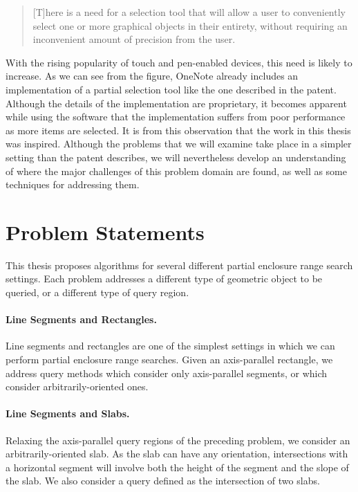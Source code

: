 \begin{quote}
[T]here is a need for a selection tool that will allow a user to conveniently select one or more graphical objects in their entirety, without requiring an inconvenient amount of precision from the user.
\end{quote}

\noindent With the rising popularity of touch and pen-enabled devices, this need is likely to increase.  
As we can see from the figure, OneNote already includes an implementation of a partial selection tool like the one described in the patent. 
Although the details of the implementation are proprietary, it becomes apparent while using the software that the implementation suffers from poor performance as more items are selected.
It is from this observation that the work in this thesis was inspired.  
Although the problems that we will examine take place in a simpler setting than the patent describes, we will nevertheless develop an understanding of where the major challenges of this problem domain are found, as well as some techniques for addressing them.


\section{Problem Statements}
\label{:intro:problems}

This thesis proposes algorithms for several different partial enclosure range search settings.  Each problem addresses a different type of geometric object to be queried, or a different type of query region.

\paragraph{Line Segments and Rectangles.} Line segments and rectangles are one of the simplest settings in which we can perform partial enclosure range searches. 
Given an axis-parallel rectangle, we address query methods which consider only axis-parallel segments, or which consider arbitrarily-oriented ones.

\paragraph{Line Segments and Slabs.} Relaxing the axis-parallel query regions of the preceding problem, we consider an arbitrarily-oriented slab.
As the slab can have any orientation, intersections with a horizontal segment will involve both the height of the segment and the slope of the slab.  
We also consider a query defined as the intersection of two slabs.

